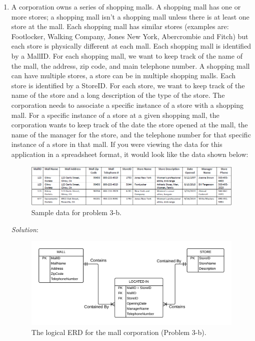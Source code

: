 \documentclass{article}
\begin{document}
\begin{enumerate}
\begin{enumerate}
		\newpage
		\item A corporation owns a series of shopping malls. A shopping mall has one or more stores; a shopping mall isn’t a shopping mall unless there is at least one store at the mall. Each shopping mall has similar stores (examples are: Footlocker, Walking Company, Jones New York, Abercrombie and Fitch) but each store is physically different at each mall. Each shopping mall is identified by a MallID. For each shopping mall, we want to keep track of the name of the mall, the address, zip code, and main telephone number. A shopping mall can have multiple stores, a store can be in multiple shopping malls. Each store is identified by a StoreID. For each store, we want to keep track of the name of the store and a long description of the type of the store. The corporation needs to associate a specific instance of a store with a shopping mall. For a specific instance of a store at a given shopping mall, the corporation wants to keep track of the date the store opened at the mall, the name of the manager for the store, and the telephone number for that specific instance of a store in that mall. If you were viewing the data for this application in a spreadsheet format, it would look like the data shown below:\\

  \begin{figure}[h!]
    \centering
    \includegraphics[width=.7\linewidth]{HW01_Part03_TableB}
    \caption{Sample data for problem 3-b.}
    \label{fig:03_b_sample_data}
  \end{figure}
  
  \textit{Solution}:
  \begin{figure}[h!]
    \centering
    \includegraphics[width=.8\linewidth]{HW01_Part03_b-ERD}
    \caption{The logical ERD for the mall corporation (Problem 3-b).}
    \label{fig:03_b_solution}
  \end{figure}
	\end{enumerate}

\end{enumerate}
\end{document}
